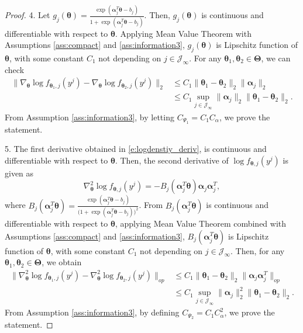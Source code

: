 \documentclass[12pt]{article}
\newcommand{\bfTheta}{\boldsymbol{\Theta}}
\newcommand{\bfalpha}{\boldsymbol{\alpha}}
\newcommand{\bftheta}{\boldsymbol{\theta}}
\begin{document}
\begin{proof}
4. Let $g_j(\bftheta) = \frac{\exp(\bfalpha_j^T \bftheta - b_j)}{1 + \exp(\bfalpha_j^T \bftheta - b_j)}$. 
Then, $g_j(\bftheta)$ is continuous and differentiable with respect to $\bftheta$. Applying Mean Value Theorem with Assumptions \ref{ass:compact} and \ref{ass:information3}, $g_j(\bftheta)$ is Lipschitz function of $\bftheta$, with some constant $C_1$ not depending on $j \in \mathcal{J}_{\infty}$. For any $\bftheta_1, \bftheta_2 \in \bfTheta$, we can check
\begin{align*}
\| \nabla_{\bftheta} \log f_{\bftheta_1, j}(y^j) - \nabla_{\bftheta} \log f_{\bftheta_2, j}(y^j) \|_2 
&\leq C_1 \|\bftheta_1 - \bftheta_2 \|_2 \| \bfalpha_j \|_2
\\ &\le C_1 \sup_{j \in \mathcal{J}_{\infty}} \| \bfalpha_j \|_2 \|\bftheta_1 - \bftheta_2 \|_2.
\end{align*}
From Assumption \ref{ass:information3}, by letting $C_{\Psi_1} = C_1 C_{\alpha}$, we prove the statement.


5. The first derivative obtained in \eqref{e:logdenstiy_deriv}, is continuous and differentiable with respect to $\bftheta$. Then, the second derivative of $\log f_{\bftheta, j}(y^j)$ is given as
\begin{equation} \label{e:logdensity_deriv2}
\nabla_{\bftheta}^2 \log f_{\bftheta, j}(y^j) = - B_j( \bfalpha_j^T \bftheta) \bfalpha_j \bfalpha_j^T,
\end{equation}
where $B_j(\bfalpha_j^T \bftheta) = \frac{\exp(\bfalpha_j^T \bftheta - b_j)}{\bigl(1+\exp(\bfalpha_j^T \bftheta - b_j) \bigr)^2}$. From $B_j(\bfalpha_j^T \bftheta)$ is continuous and differentiable with respect to $\bftheta$, applying Mean Value Theorem combined with Assumptions \ref{ass:compact} and \ref{ass:information3}, $B_j(\bfalpha_j^T \bftheta)$ is Lipschitz function of $\bftheta$, with some constant $C_1$ not depending on $j \in \mathcal{J}_{\infty}$. Then, for any $\bftheta_1, \bftheta_2 \in \bfTheta$, we obtain
\begin{align*}
\| \nabla_{\bftheta}^2 \log f_{\bftheta_1, j}(y^j) - \nabla_{\bftheta}^2 \log f_{\bftheta_2, j}(y^j) \|_{op} &\leq C_1 \| \bftheta_1 - \bftheta_2 \|_2 \| \bfalpha_j \bfalpha_j^T \|_{op}
\\ &\le C_1 \sup_{j \in \mathcal{J}_{\infty}} \| \bfalpha_j \|_2^2 \| \bftheta_1 - \bftheta_2 \|_2.
\end{align*}
From Assumption \ref{ass:information3}, by defining $C_{\Psi_2} = C_1 C_{\alpha}^2$, we prove the statement.


\end{proof}
\end{document}
